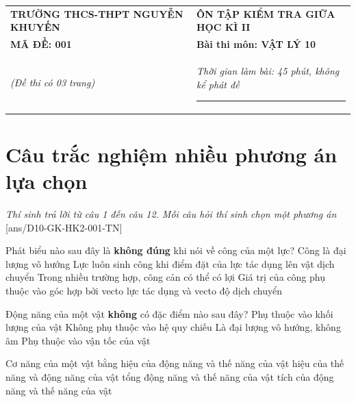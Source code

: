 \begin{center}
	\begin{tabular}{M{9.25cm}M{8.75cm}}
		\textbf{TRƯỜNG THCS-THPT NGUYỄN KHUYẾN}& \textbf{ÔN TẬP KIỂM TRA GIỮA HỌC KÌ II}\\
		\textbf{MÃ ĐỀ: 001}& \textbf{Bài thi môn: VẬT LÝ 10}\\
		\textit{(Đề thi có 03 trang)}& \textit{Thời gian làm bài: 45 phút, không kể phát đề}
		
		\noindent\rule{4cm}{0.8pt} \\
	\end{tabular}
\end{center}
\setcounter{section}{0}
\section{Câu trắc nghiệm nhiều phương án lựa chọn}
\textit{Thí sinh trả lời từ câu 1 đến câu 12. Mỗi câu hỏi thí sinh chọn một phương án}
\setcounter{ex}{0}
[ans/D10-GK-HK2-001-TN]
\begin{ex}
	Phát biểu nào sau đây là \textbf{không đúng} khi nói về công của một lực?
	\choice
	{Công là đại lượng vô hướng}
	{\True Lực luôn sinh công khi điểm đặt của lực tác dụng lên vật dịch chuyển}
	{Trong nhiều trường hợp, công cản có thể có lợi}
	{Giá trị của công phụ thuộc vào góc hợp bởi vecto lực tác dụng và vecto độ dịch chuyển}
	\loigiai{}
\end{ex}

\begin{ex}
	Động năng của một vật \textbf{không} có đặc điểm nào sau đây?
	\choice
	{Phụ thuộc vào khối lượng của vật}
	{\True Không phụ thuộc vào hệ quy chiếu}
	{Là đại lượng vô hướng, không âm}
	{Phụ thuộc vào vận tốc của vật}
	\loigiai{}
\end{ex}

\begin{ex}
	Cơ năng của một vật bằng
	\choice
	{hiệu của động năng và thế năng của vật}
	{hiệu của thế năng và động năng của vật}
	{\True tổng động năng và thế năng của vật}
	{tích của động năng và thế năng của vật}
	\loigiai{}
\end{ex}

